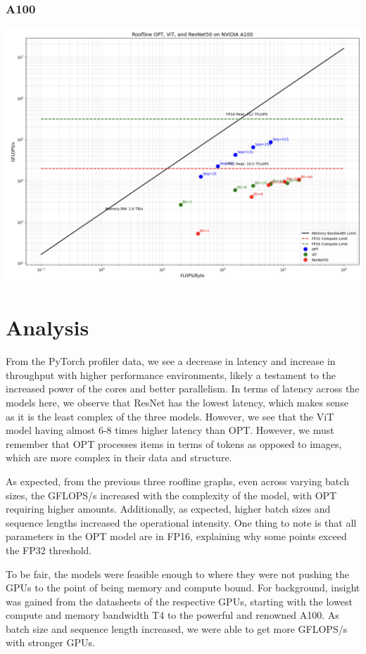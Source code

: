 \documentclass[11pt]{article}
\begin{document}
\subsubsection*{A100}
\includegraphics[width=14cm]{roofline/a100_roofline.png}

\section*{Analysis}
From the PyTorch profiler data, we see a decrease in latency and increase in throughput with higher performance environments, likely a testament to the increased power of the cores and better parallelism. In terms of latency across the models here, we observe that ResNet has the lowest latency, which makes sense as it is the least complex of the three models. However, we see that the ViT model having almost 6-8 times higher latency than OPT. However, we must remember that OPT processes items in terms of tokens as opposed to images, which are more complex in their data and structure.

As expected, from the previous three roofline graphs, even across varying batch sizes, the GFLOPS/s increased with the complexity of the model, with OPT requiring higher amounts. Additionally, as expected, higher batch sizes and sequence lengths increased the operational intensity. One thing to note is that all parameters in the OPT model are in FP16, explaining why some points exceed the FP32 threshold.

To be fair, the models were feasible enough to where they were not pushing the GPUs to the point of being memory and compute bound. For background, insight was gained from the datasheets of the respective GPUs, starting with the lowest compute and memory bandwidth T4 to the powerful and renowned A100. As batch size and sequence length increased, we were able to get more GFLOPS/s with stronger GPUs.
\end{document}
